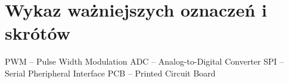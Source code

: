 \chapter*{Wykaz ważniejszych oznaczeń i skrótów} %
\noindent PWM -- Pulse Width Modulation\newline
ADC -- Analog-to-Digital Converter \newline
SPI -- Serial Pheripheral Interface\newline
PCB -- Printed Circuit Board\newline

